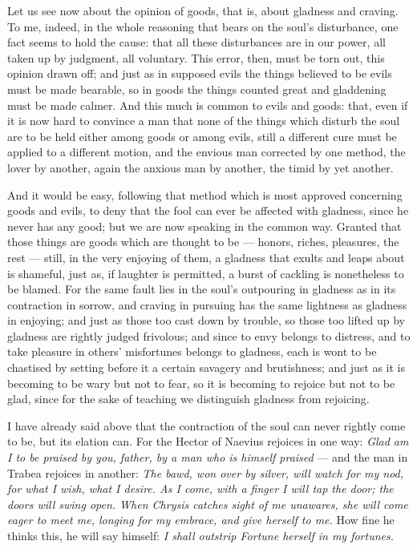  Let us see now about the opinion of goods, that is, about gladness and craving. To me, indeed, in the whole reasoning that bears on the soul's disturbance, one fact seems to hold the cause: that all these disturbances are in our power, all taken up by judgment, all voluntary. This error, then, must be torn out, this opinion drawn off; and just as in supposed evils the things believed to be evils must be made bearable, so in goods the things counted great and gladdening must be made calmer. And this much is common to evils and goods: that, even if it is now hard to convince a man that none of the things which disturb the soul are to be held either among goods or among evils, still a different cure must be applied to a different motion, and the envious man corrected by one method, the lover by another, again the anxious man by another, the timid by yet another.

 And it would be easy, following that method which is most approved concerning goods and evils, to deny that the fool can ever be affected with gladness, since he never has any good; but we are now speaking in the common way. Granted that those things are goods which are thought to be — honors, riches, pleasures, the rest — still, in the very enjoying of them, a gladness that exults and leaps about is shameful, just as, if laughter is permitted, a burst of cackling is nonetheless to be blamed. For the same fault lies in the soul's outpouring in gladness as in its contraction in sorrow, and craving in pursuing has the same lightness as gladness in enjoying; and just as those too cast down by trouble, so those too lifted up by gladness are rightly judged frivolous; and since to envy belongs to distress, and to take pleasure in others' misfortunes belongs to gladness, each is wont to be chastised by setting before it a certain savagery and brutishness; and just as it is becoming to be wary but not to fear, so it is becoming to rejoice but not to be glad, since for the sake of teaching we distinguish gladness from rejoicing.

 I have already said above that the contraction of the soul can never rightly come to be, but its elation can. For the Hector of Naevius rejoices in one way: \textit{Glad am I to be praised by you, father, by a man who is himself praised} — and the man in Trabea rejoices in another: \textit{The bawd, won over by silver, will watch for my nod, for what I wish, what I desire. As I come, with a finger I will tap the door; the doors will swing open. When Chrysis catches sight of me unawares, she will come eager to meet me, longing for my embrace, and give herself to me.} How fine he thinks this, he will say himself: \textit{I shall outstrip Fortune herself in my fortunes.}

